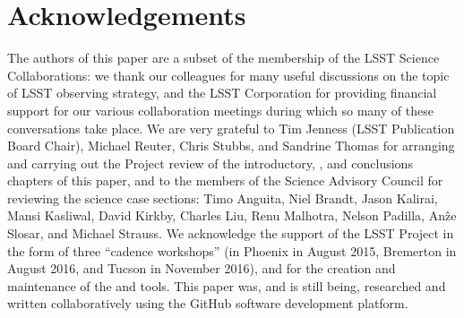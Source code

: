 
\section*{Acknowledgements}

The authors of this paper are a subset of the membership of the LSST
Science Collaborations: we thank our colleagues for many useful
discussions on the topic of LSST observing strategy, and the LSST
Corporation for providing financial support for our various
collaboration meetings during which so many of these conversations take
place. We are very grateful to Tim Jenness (LSST Publication Board
Chair), Michael Reuter, Chris Stubbs, and Sandrine Thomas for arranging
and carrying out the Project review of the introductory, \OpSim, and
conclusions chapters of this paper, and to the members of the Science
Advisory Council for reviewing the science case sections: Timo Anguita,
Niel Brandt, Jason Kalirai, Mansi Kasliwal, David Kirkby, Charles Liu,
Renu Malhotra, Nelson Padilla, An\^{z}e Slosar, and Michael Strauss. We
acknowledge the support of the LSST Project in the form of three
``cadence workshops'' (in Phoenix in August 2015, Bremerton in August
2016, and Tucson in November 2016), and for the creation and maintenance of
the \OpSim and \MAF tools. This paper was, and is still being,
researched and written collaboratively using the GitHub software
development platform.
